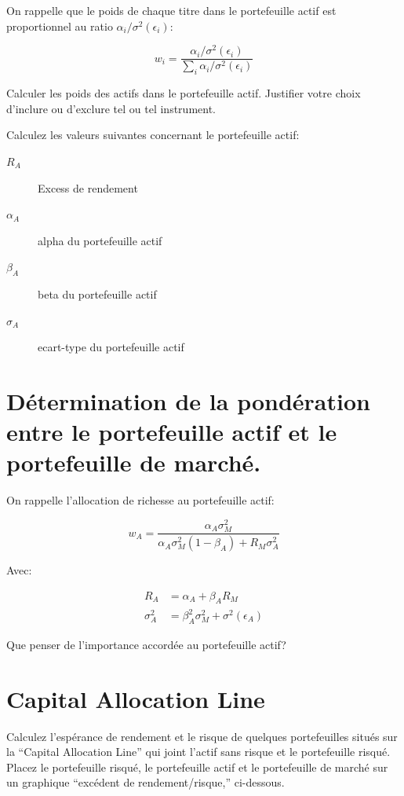 \documentclass[
]{article}
\begin{document}
On rappelle que le poids de chaque titre dans le portefeuille actif est
proportionnel au ratio \(\alpha_i/\sigma^2(\epsilon_i)\):

\[
w_i = \frac{\alpha_i/\sigma^2(\epsilon_i)}{\sum_i \alpha_i/\sigma^2(\epsilon_i)}
\]

Calculer les poids des actifs dans le portefeuille actif. Justifier
votre choix d'inclure ou d'exclure tel ou tel instrument.

Calculez les valeurs suivantes concernant le portefeuille actif:

\begin{description}
\item[$R_A$] Excess de rendement
\item[$\alpha_A$] alpha du portefeuille actif
\item[$\beta_A$]  beta du portefeuille actif
\item[$\sigma_A$] ecart-type du portefeuille actif
\end{description}

\hypertarget{duxe9termination-de-la-ponduxe9ration-entre-le-portefeuille-actif-et-le-portefeuille-de-marchuxe9.}{%
\section{Détermination de la pondération entre le portefeuille actif et
le portefeuille de
marché.}\label{duxe9termination-de-la-ponduxe9ration-entre-le-portefeuille-actif-et-le-portefeuille-de-marchuxe9.}}

On rappelle l'allocation de richesse au portefeuille actif:

\[
w_A = \frac{\alpha_A \sigma^2_M}{\alpha_A \sigma^2_M (1-\beta_A) + R_M \sigma^2_A}
\]

Avec:

\[
\begin{aligned}
R_A & = \alpha_A + \beta_A R_M \\
\sigma^2_A & = \beta^2_A \sigma^2_M + \sigma^2(\epsilon_A)
\end{aligned}
\]

Que penser de l'importance accordée au portefeuille actif?

\hypertarget{capital-allocation-line}{%
\section{Capital Allocation Line}\label{capital-allocation-line}}

Calculez l'espérance de rendement et le risque de quelques portefeuilles
situés sur la ``Capital Allocation Line'' qui joint l'actif sans risque
et le portefeuille risqué. Placez le portefeuille risqué, le
portefeuille actif et le portefeuille de marché sur un graphique
``excédent de rendement/risque,'' ci-dessous.
\end{document}
